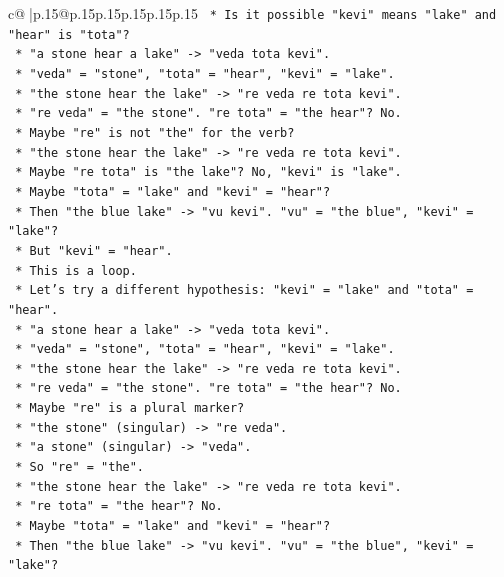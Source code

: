 \documentclass{article}
\begin{document}
{\begin{supertabular}{c@{$\;$}|p{.15\linewidth}@{}p{.15\linewidth}p{.15\linewidth}p{.15\linewidth}p{.15\linewidth}p{.15\linewidth}}
{{{\texttt{    *   Is it possible "kevi" means "lake" and "hear" is "tota"?} \\
\texttt{    *   "a stone hear a lake" {-}> "veda tota kevi".} \\
\texttt{    *   "veda" = "stone", "tota" = "hear", "kevi" = "lake".} \\
\texttt{    *   "the stone hear the lake" {-}> "re veda re tota kevi".} \\
\texttt{    *   "re veda" = "the stone". "re tota" = "the hear"? No.} \\
\texttt{    *   Maybe "re" is not "the" for the verb?} \\
\texttt{    *   "the stone hear the lake" {-}> "re veda re tota kevi".} \\
\texttt{    *   Maybe "re tota" is "the lake"? No, "kevi" is "lake".} \\
\texttt{    *   Maybe "tota" = "lake" and "kevi" = "hear"?} \\
\texttt{    *   Then "the blue lake" {-}> "vu kevi". "vu" = "the blue", "kevi" = "lake"?} \\
\texttt{    *   But "kevi" = "hear".} \\
\texttt{    *   This is a loop.} \\
\texttt{    *   Let's try a different hypothesis: "kevi" = "lake" and "tota" = "hear".} \\
\texttt{    *   "a stone hear a lake" {-}> "veda tota kevi".} \\
\texttt{    *   "veda" = "stone", "tota" = "hear", "kevi" = "lake".} \\
\texttt{    *   "the stone hear the lake" {-}> "re veda re tota kevi".} \\
\texttt{    *   "re veda" = "the stone". "re tota" = "the hear"? No.} \\
\texttt{    *   Maybe "re" is a plural marker?} \\
\texttt{    *   "the stone" (singular) {-}> "re veda".} \\
\texttt{    *   "a stone" (singular) {-}> "veda".} \\
\texttt{    *   So "re" = "the".} \\
\texttt{    *   "the stone hear the lake" {-}> "re veda re tota kevi".} \\
\texttt{    *   "re tota" = "the hear"? No.} \\
\texttt{    *   Maybe "tota" = "lake" and "kevi" = "hear"?} \\
\texttt{    *   Then "the blue lake" {-}> "vu kevi". "vu" = "the blue", "kevi" = "lake"?} \\
}}}
\end{supertabular}}
\end{document}
